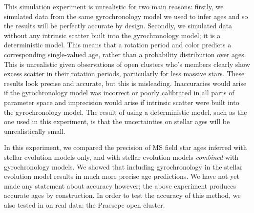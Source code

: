 This simulation experiment is unrealistic for two main reasons: firstly, we
simulated data from the same gyrochronology model we used to infer ages and so
the results will be perfectly accurate by design.
Secondly, we simulated data without any intrinsic scatter built into the
gyrochronology model; it is a deterministic model.
This means that a rotation period and color predicts a corresponding
single-valued age, rather than a probability distribution over ages.
This is unrealistic given observations of open clusters who's members clearly
show excess scatter in their rotation periods, particularly for less massive
stars.
These results look precise and accurate, but this is misleading.
Inaccuracies would arise if the gyrochronology model was incorrect or poorly
calibrated in all parts of parameter space and imprecision would arise if
intrinsic scatter were built into the gyrochronology model.
The result of using a deterministic model, such as the one used in this
experiment, is that the uncertainties on stellar ages will be unrealistically
small.

In this experiment, we compared the precision of MS field star ages inferred
with stellar evolution models only, and with stellar evolution models {\it
combined} with gyrochronology models.
We showed that including gyrochronology in the stellar evolution model results
in much more precise age predictions.
We have not yet made any statement about accuracy however; the above
experiment produces accurate ages by construction.
In order to test the accuracy of this method, we also tested in on real data:
the Praesepe open cluster.


